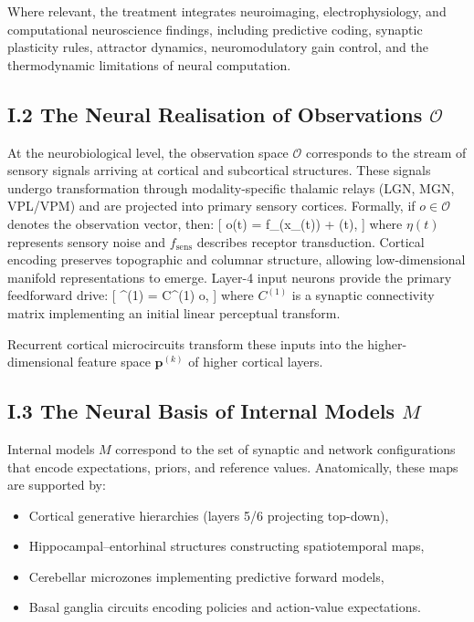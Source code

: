 \documentclass[11pt,a4paper,twoside]{article}
\begin{document}
Where relevant, the treatment integrates neuroimaging, electrophysiology, and computational neuroscience findings, including predictive coding, synaptic plasticity rules, attractor dynamics, neuromodulatory gain control, and the thermodynamic limitations of neural computation.

\medskip

\subsection*{I.2 The Neural Realisation of Observations $\mathcal{O}$}

At the neurobiological level, the observation space $\mathcal{O}$ corresponds to the stream of sensory signals arriving at cortical and subcortical structures. These signals undergo transformation through modality-specific thalamic relays (LGN, MGN, VPL/VPM) and are projected into primary sensory cortices. Formally, if $o \in \mathcal{O}$ denotes the observation vector, then:
[
o(t) = f_{}(x_{}(t)) + \eta(t),
]
where $\eta(t)$ represents sensory noise and $f_{\mathrm{sens}}$ describes receptor transduction. Cortical encoding preserves topographic and columnar structure, allowing low-dimensional manifold representations to emerge. Layer-4 input neurons provide the primary feedforward drive:
[
^{(1)} = C^{(1)} o,
]
where $C^{(1)}$ is a synaptic connectivity matrix implementing an initial linear perceptual transform.

Recurrent cortical microcircuits transform these inputs into the higher-dimensional feature space $\mathbf{p}^{(k)}$ of higher cortical layers.

\subsection*{I.3 The Neural Basis of Internal Models $M$}

Internal models $M$ correspond to the set of synaptic and network configurations that encode expectations, priors, and reference values. Anatomically, these maps are supported by:

\begin{itemize}
\item Cortical generative hierarchies (layers 5/6 projecting top-down),
\item Hippocampal--entorhinal structures constructing spatiotemporal maps,
\item Cerebellar microzones implementing predictive forward models,
\item Basal ganglia circuits encoding policies and action-value expectations.
\end{itemize}
\end{document}
